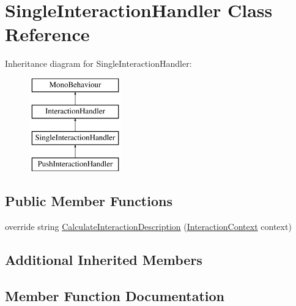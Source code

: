 \hypertarget{class_single_interaction_handler}{}\section{Single\+Interaction\+Handler Class Reference}
\label{class_single_interaction_handler}
Inheritance diagram for Single\+Interaction\+Handler\+:\begin{figure}[H]
\begin{center}
\leavevmode
\includegraphics[height=4.000000cm]{class_single_interaction_handler}
\end{center}
\end{figure}
\subsection*{Public Member Functions}
\begin{DoxyCompactItemize}
\item 
override string \mbox{\hyperlink{class_single_interaction_handler_a79e3c1727bf6f3f9068c6d15bf394b41}{Calculate\+Interaction\+Description}} (\mbox{\hyperlink{class_interaction_context}{Interaction\+Context}} context)
\end{DoxyCompactItemize}
\subsection*{Additional Inherited Members}


\subsection{Member Function Documentation}
\mbox{\label{class_single_interaction_handler_a79e3c1727bf6f3f9068c6d15bf394b41}} 
